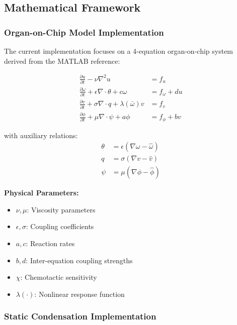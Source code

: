 \subsection{Mathematical Framework}

\subsubsection{Organ-on-Chip Model Implementation}

The current implementation focuses on a 4-equation organ-on-chip system derived from the MATLAB reference:

\begin{align}
\frac{\partial u}{\partial t} - \nu \nabla^2 u &= f_u \label{eq:ooc_u} \\
\frac{\partial \omega}{\partial t} + \epsilon \nabla \cdot \theta + c\omega &= f_\omega + d u \label{eq:ooc_omega} \\
\frac{\partial v}{\partial t} + \sigma \nabla \cdot q + \lambda(\bar{\omega}) v &= f_v \label{eq:ooc_v} \\
\frac{\partial \phi}{\partial t} + \mu \nabla \cdot \psi + a\phi &= f_\phi + b v \label{eq:ooc_phi}
\end{align}

with auxiliary relations:
\begin{align}
\theta &= \epsilon(\nabla \omega - \hat{\omega}) \\
q &= \sigma(\nabla v - \hat{v}) \\
\psi &= \mu(\nabla \phi - \hat{\phi})
\end{align}

\textbf{Physical Parameters:}
\begin{itemize}
    \item $\nu, \mu$: Viscosity parameters
    \item $\epsilon, \sigma$: Coupling coefficients  
    \item $a, c$: Reaction rates
    \item $b, d$: Inter-equation coupling strengths
    \item $\chi$: Chemotactic sensitivity
    \item $\lambda(\cdot)$: Nonlinear response function
\end{itemize}

\subsubsection{Static Condensation Implementation}

